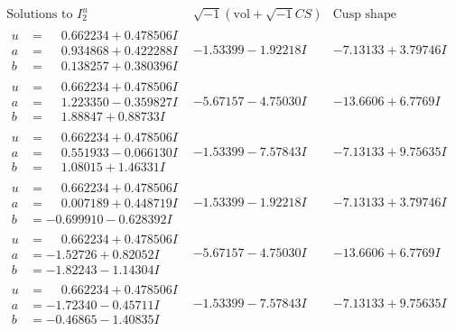 \documentclass[1p]{elsarticle_modified}
\theoremstyle{definition}
\newcommand{\I}{\sqrt{-1}}
\begin{document}
$$\begin{array}{c|c|c}  
\text{Solutions to }I^u_{2}& \I (\text{vol} + \sqrt{-1}CS) & \text{Cusp shape}\\
 \hline 
\begin{aligned}
u &= \phantom{-}0.662234 + 0.478506 I \\
a &= \phantom{-}0.934868 + 0.422288 I \\
b &= \phantom{-}0.138257 + 0.380396 I\end{aligned}
 & -1.53399 - 1.92218 I & -7.13133 + 3.79746 I \\ \hline\begin{aligned}
u &= \phantom{-}0.662234 + 0.478506 I \\
a &= \phantom{-}1.223350 - 0.359827 I \\
b &= \phantom{-}1.88847 + 0.88733 I\end{aligned}
 & -5.67157 - 4.75030 I & -13.6606 + 6.7769 I \\ \hline\begin{aligned}
u &= \phantom{-}0.662234 + 0.478506 I \\
a &= \phantom{-}0.551933 - 0.066130 I \\
b &= \phantom{-}1.08015 + 1.46331 I\end{aligned}
 & -1.53399 - 7.57843 I & -7.13133 + 9.75635 I \\ \hline\begin{aligned}
u &= \phantom{-}0.662234 + 0.478506 I \\
a &= \phantom{-}0.007189 + 0.448719 I \\
b &= -0.699910 - 0.628392 I\end{aligned}
 & -1.53399 - 1.92218 I & -7.13133 + 3.79746 I \\ \hline\begin{aligned}
u &= \phantom{-}0.662234 + 0.478506 I \\
a &= -1.52726 + 0.82052 I \\
b &= -1.82243 - 1.14304 I\end{aligned}
 & -5.67157 - 4.75030 I & -13.6606 + 6.7769 I \\ \hline\begin{aligned}
u &= \phantom{-}0.662234 + 0.478506 I \\
a &= -1.72340 - 0.45711 I \\
b &= -0.46865 - 1.40835 I\end{aligned}
 & -1.53399 - 7.57843 I & -7.13133 + 9.75635 I \\ \hline\begin{aligned}

\end{aligned}
\end{array}$$
\end{document}
